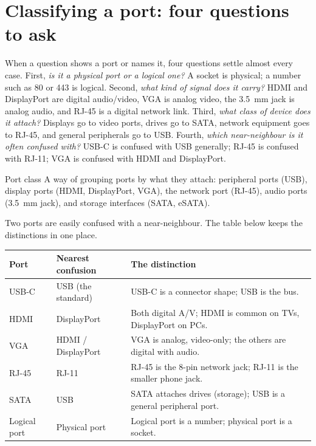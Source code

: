 \section{Classifying a port: four questions to ask}
When a question shows a port or names it, four questions settle almost every
case. First, \emph{is it a physical port or a logical one?} A socket is
physical; a number such as 80 or 443 is logical. Second, \emph{what kind of
signal does it carry?} HDMI and DisplayPort are digital audio/video, VGA is
analog video, the 3.5~mm jack is analog audio, and RJ-45 is a digital network
link. Third, \emph{what class of device does it attach?} Displays go to
video ports, drives go to SATA, network equipment goes to RJ-45, and general
peripherals go to USB. Fourth, \emph{which near-neighbour is it often
confused with?} USB-C is confused with USB generally; RJ-45 is confused with
RJ-11; VGA is confused with HDMI and DisplayPort.

\begin{definitionbox}{Port class}
A way of grouping ports by what they attach: peripheral ports (USB), display
ports (HDMI, DisplayPort, VGA), the network port (RJ-45), audio ports (3.5~mm
jack), and storage interfaces (SATA, eSATA).
\end{definitionbox}

Two ports are easily confused with a near-neighbour. The table below keeps the
distinctions in one place.

\begin{center}
\begin{tabular}{p{}p{}p{}}
\toprule
\textbf{Port} & \textbf{Nearest confusion} & \textbf{The distinction} \\
\midrule
USB-C & USB (the standard) & USB-C is a connector shape; USB is the bus. \\
HDMI & DisplayPort & Both digital A/V; HDMI is common on TVs, DisplayPort on PCs. \\
VGA & HDMI / DisplayPort & VGA is analog, video-only; the others are digital with audio. \\
RJ-45 & RJ-11 & RJ-45 is the 8-pin network jack; RJ-11 is the smaller phone jack. \\
SATA & USB & SATA attaches drives (storage); USB is a general peripheral port. \\
Logical port & Physical port & Logical port is a number; physical port is a socket. \\
\bottomrule
\end{tabular}
\end{center}

